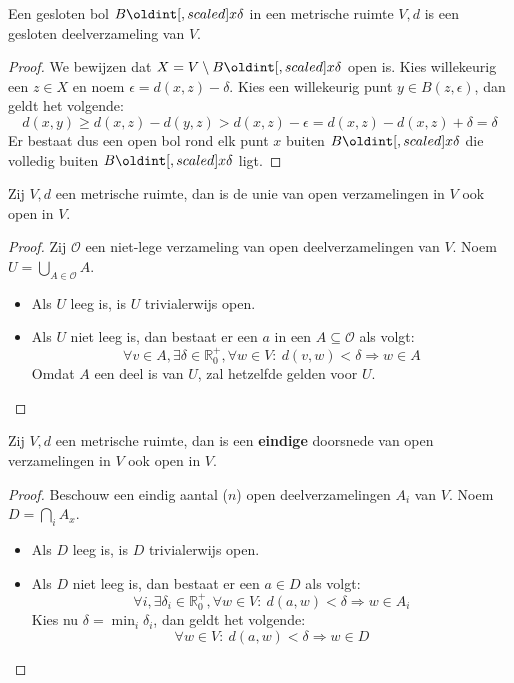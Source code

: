 \documentclass[main.tex]{subfiles}
\begin{document}
\begin{st}
  Een gesloten bol $B\interval{x}{\delta}$ in een metrische ruimte $V,d$ is een gesloten deelverzameling van $V$.

  \begin{proof}
    We bewijzen dat $X = V \setminus B\interval{x}{\delta}$ open is.
    Kies willekeurig een $z\in X$ en noem $\epsilon = d(x,z) - \delta$.
    Kies een willekeurig punt $y\in B(z,\epsilon)$, dan geldt het volgende:
    \[ d(x,y) \ge d(x,z) - d(y,z) > d(x,z) - \epsilon = d(x,z) -d(x,z) + \delta = \delta \]
    Er bestaat dus een open bol rond elk punt $x$ buiten $B\interval{x}{\delta}$ die volledig buiten $B\interval{x}{\delta}$ ligt.
  \end{proof}
\end{st}

\begin{pr}
  Zij $V,d$ een metrische ruimte, dan is de unie van open verzamelingen in $V$ ook open in $V$.

  \begin{proof}
    Zij $\mathcal{O}$ een niet-lege verzameling van open deelverzamelingen van $V$.
    Noem $U = \bigcup_{A\in \mathcal{O}}A$.
    \begin{itemize}
    \item Als $U$ leeg is, is $U$ trivialerwijs open.
    \item Als $U$ niet leeg is, dan bestaat er een $a$ in een $A \subseteq \mathcal{O}$ als volgt:
      \[ \forall v\in A, \exists \delta \in \mathbb{R}_{0}^{+}, \forall w\in V:\ d(v,w) < \delta \Rightarrow w \in A \]
      Omdat $A$ een deel is van $U$, zal hetzelfde gelden voor $U$.
    \end{itemize}
  \end{proof}
\end{pr}

\begin{pr}
  Zij $V,d$ een metrische ruimte, dan is een \textbf{eindige} doorsnede van open verzamelingen in $V$ ook open in $V$.
  
  \begin{proof}
    Beschouw een eindig aantal ($n$) open deelverzamelingen $A_{i}$ van $V$.
    Noem $D = \bigcap_{i}A_{x}$.
    \begin{itemize}
    \item Als $D$ leeg is, is $D$ trivialerwijs open.
    \item Als $D$ niet leeg is, dan bestaat er een $a\in D$ als volgt:
      \[ \forall i, \exists \delta_{i} \in \mathbb{R}_{0}^{+}, \forall w\in V:\ d(a,w) < \delta \Rightarrow w \in A_{i} \]
      Kies nu $\delta = \min_{i}\delta_{i}$, dan geldt het volgende:
      \[ \forall w\in V:\ d(a,w) < \delta \Rightarrow w\in D \]
    \end{itemize}
  \end{proof}
\end{pr}
\end{document}
